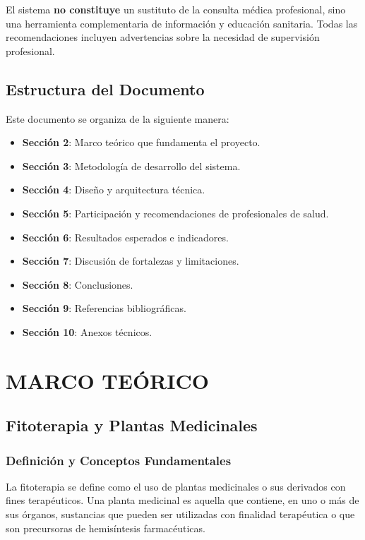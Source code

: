 \documentclass[12pt,a4paper]{article}
\begin{document}
El sistema \textbf{no constituye} un sustituto de la consulta médica profesional, sino una herramienta complementaria de información y educación sanitaria. Todas las recomendaciones incluyen advertencias sobre la necesidad de supervisión profesional.

\subsection{Estructura del Documento}

Este documento se organiza de la siguiente manera:

\begin{itemize}
    \item \textbf{Sección 2}: Marco teórico que fundamenta el proyecto.
    \item \textbf{Sección 3}: Metodología de desarrollo del sistema.
    \item \textbf{Sección 4}: Diseño y arquitectura técnica.
    \item \textbf{Sección 5}: Participación y recomendaciones de profesionales de salud.
    \item \textbf{Sección 6}: Resultados esperados e indicadores.
    \item \textbf{Sección 7}: Discusión de fortalezas y limitaciones.
    \item \textbf{Sección 8}: Conclusiones.
    \item \textbf{Sección 9}: Referencias bibliográficas.
    \item \textbf{Sección 10}: Anexos técnicos.
\end{itemize}


\section{MARCO TEÓRICO}

\subsection{Fitoterapia y Plantas Medicinales}

\subsubsection{Definición y Conceptos Fundamentales}

La fitoterapia se define como el uso de plantas medicinales o sus derivados con fines terapéuticos\cite{WHO2013}. Una planta medicinal es aquella que contiene, en uno o más de sus órganos, sustancias que pueden ser utilizadas con finalidad terapéutica o que son precursoras de hemisíntesis farmacéuticas\cite{WHO1998}.
\end{document}
